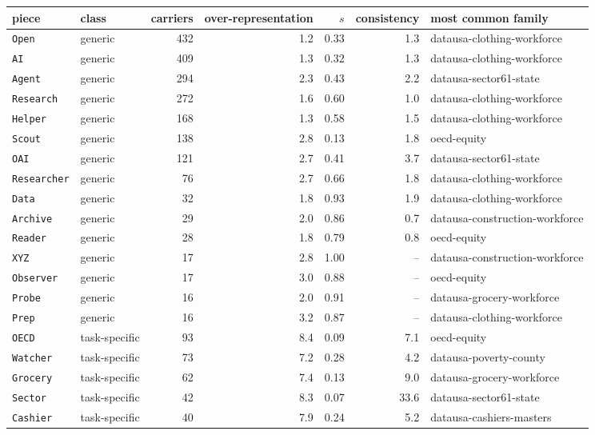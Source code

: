 \begin{tabular}{llrrrrl}
\toprule
piece & class & carriers & over-representation & $s$ & consistency & most common family \\
\midrule
\texttt{Open} & generic & 432 & 1.2 & 0.33 & 1.3 & datausa-clothing-workforce \\
\texttt{AI} & generic & 409 & 1.3 & 0.32 & 1.3 & datausa-clothing-workforce \\
\texttt{Agent} & generic & 294 & 2.3 & 0.43 & 2.2 & datausa-sector61-state \\
\texttt{Research} & generic & 272 & 1.6 & 0.60 & 1.0 & datausa-clothing-workforce \\
\texttt{Helper} & generic & 168 & 1.3 & 0.58 & 1.5 & datausa-clothing-workforce \\
\texttt{Scout} & generic & 138 & 2.8 & 0.13 & 1.8 & oecd-equity \\
\texttt{OAI} & generic & 121 & 2.7 & 0.41 & 3.7 & datausa-sector61-state \\
\texttt{Researcher} & generic & 76 & 2.7 & 0.66 & 1.8 & datausa-clothing-workforce \\
\texttt{Data} & generic & 32 & 1.8 & 0.93 & 1.9 & datausa-clothing-workforce \\
\texttt{Archive} & generic & 29 & 2.0 & 0.86 & 0.7 & datausa-construction-workforce \\
\texttt{Reader} & generic & 28 & 1.8 & 0.79 & 0.8 & oecd-equity \\
\texttt{XYZ} & generic & 17 & 2.8 & 1.00 & -- & datausa-construction-workforce \\
\texttt{Observer} & generic & 17 & 3.0 & 0.88 & -- & oecd-equity \\
\texttt{Probe} & generic & 16 & 2.0 & 0.91 & -- & datausa-grocery-workforce \\
\texttt{Prep} & generic & 16 & 3.2 & 0.87 & -- & datausa-clothing-workforce \\
\texttt{OECD} & task-specific & 93 & 8.4 & 0.09 & 7.1 & oecd-equity \\
\texttt{Watcher} & task-specific & 73 & 7.2 & 0.28 & 4.2 & datausa-poverty-county \\
\texttt{Grocery} & task-specific & 62 & 7.4 & 0.13 & 9.0 & datausa-grocery-workforce \\
\texttt{Sector} & task-specific & 42 & 8.3 & 0.07 & 33.6 & datausa-sector61-state \\
\texttt{Cashier} & task-specific & 40 & 7.9 & 0.24 & 5.2 & datausa-cashiers-masters \\

\end{tabular}
